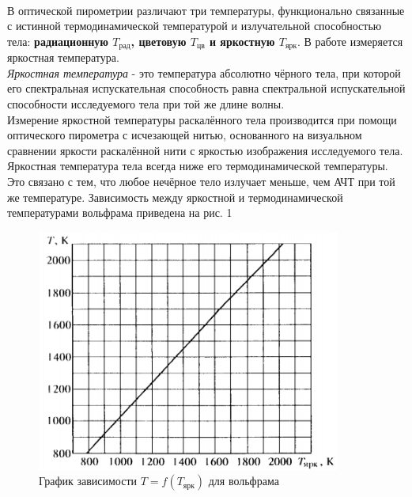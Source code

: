 \documentclass[a4paper,12pt]{article}
\begin{document}
\paragraph{}
В оптической пирометрии различают три температуры, функционально связанные с истинной термодинамической температурой и излучательной способностью тела: \textbf{радиационную $T_{\text{рад}}$, цветовую $T_{\text{цв}}$ и яркостную $T_{\text{ярк}}$}. В работе измеряется яркостная температура. \\
\textit{Яркостная температура} - это температура абсолютно чёрного тела, при которой его спектральная испускательная способность равна спектральной испускательной способности исследуемого тела при той же длине волны.\\
Измерение яркостной температуры раскалённого тела производится при помощи оптического пирометра с исчезающей нитью, основанного на визуальном сравнении яркости раскалённой нити с яркостью изображения исследуемого тела. \\
Яркостная температура тела всегда ниже его термодинамической температуры. Это связано с тем, что любое нечёрное тело излучает меньше, чем АЧТ при той же температуре. Зависимость между яркостной и термодинамической температурами вольфрама приведена на рис. 1

\begin{figure}[h]
    \centering
    \includegraphics[width=10cm]{fig2.PNG}
    \caption{График зависимости $T = f(T_{\text{ярк}})$ для вольфрама}
    \label{fig:vac}
\end{figure}
\end{document}
